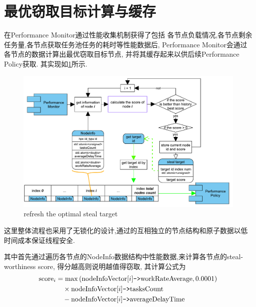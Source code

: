 \documentclass{mproj}
\begin{document}
\section{最优窃取目标计算与缓存}

在Performance Monitor通过性能收集机制获得了包括
各节点负载情况,各节点剩余任务量,各节点获取任务池任务的耗时等性能数据后,
Performance Monitor会通过各节点的数据计算出最优窃取目标节点,
并将其缓存起来以供后续Performance Policy获取.
其实现如\cref{fig:refresh_target}所示.

\begin{figure}[h]
    \centering %
    \includegraphics[width=1\textwidth]{images/refresh_target.pdf} %
    \caption{refresh the optimal steal target} %
    \label{fig:refresh_target} %
\end{figure}
\FloatBarrier

这里整体流程也采用了无锁化的设计,通过的互相独立的节点结构和原子数据以低时间成本保证线程安全.

其中首先通过遍历各节点的NodeInfo数据结构中性能数据,来计算各节点的steal-worthiness score,
得分越高则说明越值得窃取,
其计算公式为
\begin{align}
    \text{score}_i & = \max\left(\text{nodeInfoVector}[i]\texttt{->}\text{workRateAverage}, 0.0001 \right) \notag \\
                   & \quad\times \text{nodeInfoVector}[i]\texttt{->}\text{tasksCount} \notag                      \\
                   & \quad - \text{nodeInfoVector}[i]\texttt{->}\text{averageDelayTime} \label{eq:score}
\end{align}
\end{document}
